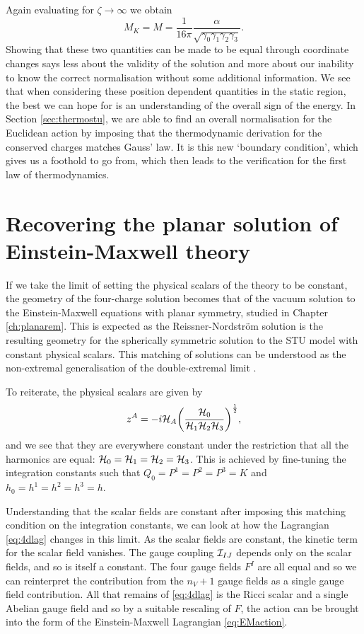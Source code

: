 Again evaluating for $\zeta \to \infty$ we obtain
\begin{equation}
\label{eq:rescaledstumass}
	M_K = M = \frac{1}{16\pi} \frac{\alpha}{\sqrt{\gamma_0 \gamma_1 \gamma_2 \gamma_3}}.
\end{equation}
Showing that these two quantities can be made to be equal through coordinate changes says less about the validity of the solution and more about our inability to know the correct normalisation without some additional information. We see that when considering these position dependent quantities in the static region, the best we can hope for is an understanding of the overall sign of the energy. In Section \ref{sec:thermostu}, we are able to find an overall normalisation for the Euclidean action by imposing that the thermodynamic derivation for the conserved charges matches Gauss' law. It is this new `boundary condition', which gives us a foothold to go from, which then leads to the verification for the first law of thermodynamics.


\section{Recovering the planar solution of Einstein-Maxwell theory}
\label{sec:emfromstu}
If we take the limit of setting the physical scalars of the theory to be constant, the geometry of the four-charge solution becomes that of the vacuum solution to the Einstein-Maxwell equations with planar symmetry, studied in Chapter \ref{ch:planarem}. This is expected as the Reissner-Nordstr\"om solution is the resulting geometry for the spherically symmetric solution to the STU model with constant physical scalars. This matching of solutions can be understood as the non-extremal generalisation of the double-extremal limit \cite{Ferrara:1997tw}.

To reiterate, the physical scalars are given by
\begin{equation*}
    z^A = -i {\cal H}_A \bigg(\frac{{\cal H}_0}{{\cal H}_1 {\cal H}_2 {\cal H}_3} \bigg)^{\frac{1}{2}},
\end{equation*}
and we see that they are everywhere constant under the restriction that all the harmonics are equal: ${\cal H}_0 = {\cal H}_1 = {\cal H}_2 = {\cal H}_3$. This is achieved by fine-tuning the integration constants such that $Q_0 = P^1 = P^2 = P^3 = K$ and $h_0 = h^1 = h^2 = h^3 = h$.

Understanding that the scalar fields are constant after imposing this matching condition on the integration constants, we can look at how the Lagrangian \eqref{eq:4dlag} changes in this limit. As the scalar fields are constant, the kinetic term for the scalar field vanishes. The gauge coupling ${\cal I}_{IJ}$ depends only on the scalar fields, and so is itself a constant. The four gauge fields $F^I$ are all equal and so we can reinterpret the contribution from the $n_V + 1$ gauge fields as a single gauge field contribution. All that remains of \eqref{eq:4dlag} is the Ricci scalar and a single Abelian gauge field and so by a suitable rescaling of $F$, the action can be brought into the form of the Einstein-Maxwell Lagrangian \eqref{eq:EMaction}.

